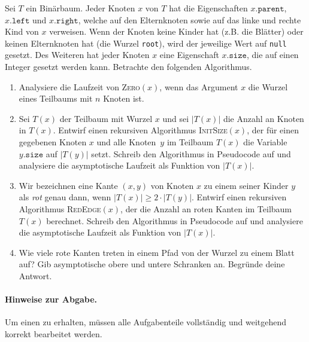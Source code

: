 \documentclass{uebung_cs}
\begin{document}
Sei $T$ ein Binärbaum.
Jeder Knoten $x$ von $T$ hat die Eigenschaften $x.\texttt{parent}$, $x.\texttt{left}$ und $x.\texttt{right}$, welche auf den Elternknoten sowie auf das linke und rechte Kind von $x$ verweisen.
Wenn der Knoten keine Kinder hat (z.B. die Blätter) oder keinen Elternknoten hat (die Wurzel \texttt{root}), wird der jeweilige Wert auf \texttt{null} gesetzt.
Des Weiteren hat jeder Knoten $x$ eine Eigenschaft $x.\texttt{size}$, die auf einen Integer gesetzt werden kann.
Betrachte den folgenden Algorithmus.
\begin{algorithmic}
    \EndIf
    \EndProcedure
\end{algorithmic}
\begin{enumerate}
    \item Analysiere die Laufzeit von \textsc{Zero}$(x)$, wenn das Argument $x$ die Wurzel eines Teilbaums mit $n$ Knoten ist.
    \item Sei $T(x)$ der Teilbaum mit Wurzel $x$ und sei $|T(x)|$ die Anzahl an Knoten in $T(x)$.
    Entwirf einen rekursiven Algorithmus \textsc{InitSize$(x)$}, der für einen gegebenen Knoten $x$ und alle Knoten~$y$ im Teilbaum $T(x)$ die Variable $y.\texttt{size}$ auf $|T(y)|$ setzt.
    Schreib den Algorithmus in Pseudocode auf und analysiere die asymptotische Laufzeit als Funktion von $|T(x)|$.
    \item Wir bezeichnen eine Kante $(x,y)$ von Knoten $x$ zu einem seiner Kinder $y$ als \emph{rot} genau dann, wenn $|T(x)| \geq 2\cdot|T(y)|$.
    Entwirf einen rekursiven Algorithmus \textsc{RedEdge$(x)$}, der die Anzahl an roten Kanten im Teilbaum $T(x)$ berechnet.
    Schreib den Algorithmus in Pseudocode auf und analysiere die asymptotische Laufzeit als Funktion von $|T(x)|$.
    \item Wie viele rote Kanten treten in einem Pfad von der Wurzel zu einem Blatt auf?
    Gib asymptotische obere und untere Schranken an. Begründe deine Antwort.
\end{enumerate}
  
  \paragraph*{Hinweise zur Abgabe.}
  Um einen  zu erhalten, müssen alle Aufgabenteile vollständig und weitgehend korrekt bearbeitet werden.
\end{document}
